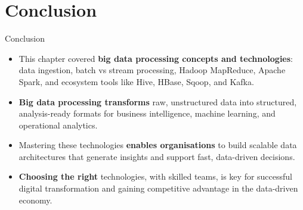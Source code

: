 \documentclass[aspectratio=169, table]{beamer}
\begin{document}
\section{Conclusion}
\begin{frame}{Conclusion}
	\vspace{20pt}
	
	\begin{itemize}
		\item This chapter covered \textbf{big data processing concepts and technologies}: data ingestion, batch vs stream processing, Hadoop MapReduce, Apache Spark, and ecosystem tools like Hive, HBase, Sqoop, and Kafka.
		
		\item \textbf{Big data processing transforms} raw, unstructured data into structured, analysis-ready formats for business intelligence, machine learning, and operational analytics.
		
		\item Mastering these technologies \textbf{enables organisations} to build scalable data architectures that generate insights and support fast, data-driven decisions.
		
		\item \textbf{Choosing the right} technologies, with skilled teams, is key for successful digital transformation and gaining competitive advantage in the data-driven economy.
	\end{itemize}
	
\end{frame}
\end{document}
